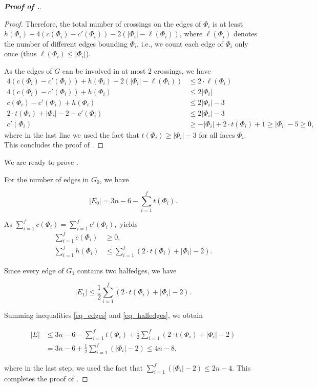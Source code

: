 \documentclass[10pt]{article}
\theoremstyle{definition}
\begin{document}
\begin{proof}[\bf Proof of .]
\begin{proof}
Therefore, the total number of crossings on the edges of $\Phi_i$ 
is at least $h(\Phi_i) + 4(c(\Phi_i)- c'(\Phi_i)) - 2(|\Phi_i|-\ell(\Phi_i))$, 
where $\ell(\Phi_i)$ denotes the number of different edges bounding $\Phi_i$, i.e., we count each edge of $\Phi_i$ only once (thus $\ell(\Phi_i) \leq |\Phi_i|$).


As the edges of $G$ can be involved in at most $2$ crossings, we have
\begin{align*}
    4(c(\Phi_i)- c'(\Phi_i)) + h(\Phi_i) - 2(|\Phi_i|-\ell(\Phi_i))&\leq 2 \cdot \ell(\Phi_i)\\
    4(c(\Phi_i)- c'(\Phi_i)) + h(\Phi_i) &\leq 2 |\Phi_i|\\
    c(\Phi_i)- c'(\Phi_i) + h(\Phi_i) &\leq 2 |\Phi_i|-3\\
    2 \cdot t(\Phi_i)+ |\Phi_i| -2 - c'(\Phi_i) &\leq 2 |\Phi_i|-3\\
     c'(\Phi_i) &\geq  - |\Phi_i| +2 \cdot t(\Phi_i) +1 \geq |\Phi_i| -5 \geq 0,
\end{align*}
where in the last line we used the fact that $t(\Phi_i) \geq |\Phi_i|-3$ for all faces $\Phi_i$. This concludes the proof of .
\end{proof}

We are ready to prove .

For the number of edges in $G_0$, we have

\begin{equation} \label{eq_edges}
|E_0| = 3n -6 -\sum_{i=1}^f t(\Phi_i).
\end{equation}


As $\sum_{i=1}^f c(\Phi_i)=\sum_{i=1}^f c'(\Phi_i), $  yields
\begin{align*}
    \sum_{i=1}^f c(\Phi_i) &\geq 0,\\
    \sum_{i=1}^f h(\Phi_i) &\leq  \sum_{i=1}^f \left( 2 \cdot t(\Phi_i) +|\Phi_i| -2 \right).
\end{align*}


Since every edge of $G_1$ contains two halfedges, we have

\begin{equation} \label{eq_halfedges}
|E_1| \leq \frac{1}{2} \sum_{i=1}^f \left( 2 \cdot t(\Phi_i) +|\Phi_i| -2 \right).
\end{equation}


Summing inequalities \eqref{eq_edges} and \eqref{eq_halfedges}, we obtain

\begin{align*}
    |E| &\leq 3n-6  -\sum_{i=1}^f t(\Phi_i)  + \frac{1}{2} \sum_{i=1}^f \left( 2 \cdot t(\Phi_i) +|\Phi_i| -2 \right)\\
     &= 3n-6 + \frac{1}{2} \sum_{i=1}^f (|\Phi_i| -2) \le 4n-8,
\end{align*}

where in the last step, we used the fact that $\sum_{i=1}^f (|\Phi_i| -2) \le 2n-4$. This completes the proof of . 
\end{proof}
\end{document}
